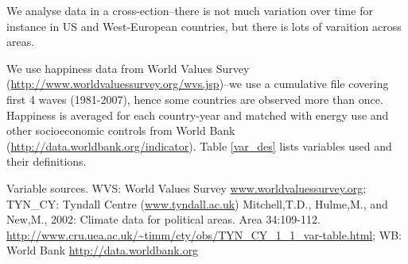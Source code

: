 \documentclass[10pt, letterpaper]{article}
\begin{document}
\begin{spacing}{1.4}


We analyse data in a cross-ection--there is not much variation over time for
instance in US and West-European countries, %
 but there is lots of varaition across areas.

We use happiness data from World Values Survey
(\url{http://www.worldvaluessurvey.org/wvs.jsp})--we use a cumulative file
covering first 4 waves (1981-2007), hence some countries are observed more than
once. Happiness is averaged for each country-year and matched with energy use
and other  socioeconomic controls from World Bank
(\url{http://data.worldbank.org/indicator}). Table \ref{var_des} lists variables
used and their definitions.



{\scriptsize \noindent Variable sources. WVS: World Values Survey \url{www.worldvaluessurvey.org};
TYN\_CY: Tyndall Centre (\url{www.tyndall.ac.uk}) Mitchell,T.D., Hulme,M., and
New,M., 2002: Climate data for political areas. Area
34:109-112. \url{http://www.cru.uea.ac.uk/~timm/cty/obs/TYN_CY_1_1_var-table.html};
WB: World Bank \url{http://data.worldbank.org}}



\end{spacing}
\end{document}
